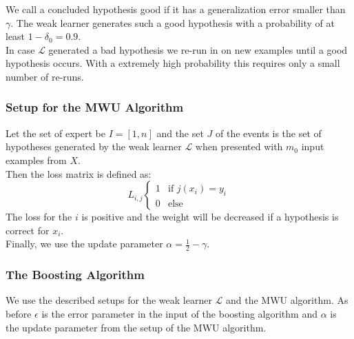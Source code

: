 \documentclass[english]{panikzettel}
\begin{document}
We call a concluded hypothesis good if it has a generalization error smaller than $\gamma$. The weak learner generates such a good hypothesis with a probability of at least $1-\delta_0=0.9$.\\
In case $\mathcal{L}$ generated a bad hypothesis we re-run in on new examples until a good hypothesis occurs. With a extremely high probability this requires only a small number of re-runs. %


\subsubsection{Setup for the MWU Algorithm}
Let the set of expert be $I=[1,n]$ and the set $J$ of the events is the set of hypotheses generated by the weak learner $\mathcal{L}$ when presented with $m_0$ input examples from $X$.\\
Then the loss matrix is defined as:
\[
L_{i,j}
\begin{cases}
1 & \text{if } j(x_i)=y_i\\
0 & \text{else}
\end{cases}
\]
The loss for the $i$ is positive and the weight will be decreased if a hypothesis is correct for $x_i$.\\
Finally, we use the update parameter $\alpha=\frac{1}{2}-\gamma$.

\subsubsection{The Boosting Algorithm}
We use the described setups for the weak learner $\mathcal{L}$ and the MWU algorithm. As before $\epsilon$ is the error parameter in the input of the boosting algorithm and $\alpha$ is the update parameter from the setup of the MWU algorithm.
\end{document}
